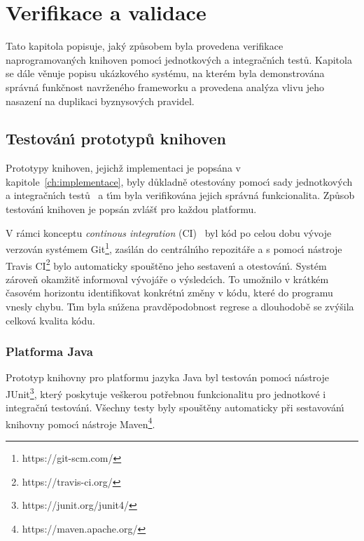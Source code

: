 

\chapter{Verifikace a validace}\label{ch:verifikace}

Tato kapitola popisuje, jak\'y způsobem byla provedena
verifikace naprogramovan\'ych knihoven pomoc\'{\i}
jednotkov\'ych a integračn\'{\i}ch testů.
Kapitola se dále věnuje popisu ukázkového systému, na kterém
byla demonstrována správná funkčnost navrženého frameworku
a provedena analýza vlivu jeho nasazení na duplikaci
byznysových pravidel.

\section{Testován\'{\i} prototypů knihoven}

Prototypy knihoven, jejichž implementaci je popsána v kapitole~\ref{ch:implementace},
byly důkladně otestovány pomoc\'{\i} sady jednotkov\'ych a integračn\'{\i}ch testů~\cite{luo2001software}
a t\'{\i}m byla verifikována jejich správná funkcionalita. Způsob
testován\'{\i} knihoven je popsán zvlášť pro každou platformu.

V rámci konceptu \textit{continous integration} (\gls{CI})~\cite{fowler2006continuous}
byl kód po celou dobu v\'yvoje verzován systémem Git\footnote{https://git-scm.com/},
zas\'{\i}lán do centráln\'{\i}ho repozitáře a s pomoc\'{\i}
nástroje Travis \gls{CI}\footnote{https://travis-ci.org/}
bylo automaticky spouštěno jeho sestaven\'{\i} a otestován\'{\i}.
Systém zároveň okamžitě informoval v\'yvojáře o v\'ysledc\'{\i}ch.
To umožnilo v krátkém časovém horizontu identifikovat konkrétn\'{\i} změny
v kódu, které do programu vnesly chybu. T\'{\i}m byla sn\'{\i}žena
pravděpodobnost regrese a dlouhodobě se zv\'yšila celková kvalita kódu.

\subsection{Platforma Java}

Prototyp knihovny pro platformu jazyka Java byl testován pomoc\'{\i}
nástroje JUnit\footnote{https://junit.org/junit4/}, kter\'y poskytuje veškerou potřebnou funkcionalitu pro
jednotkové i integračn\'{\i} testován\'{\i}. Všechny testy byly spouštěny automaticky
při sestavován\'{\i} knihovny pomoc\'{\i} nástroje Maven\footnote{https://maven.apache.org/}.

